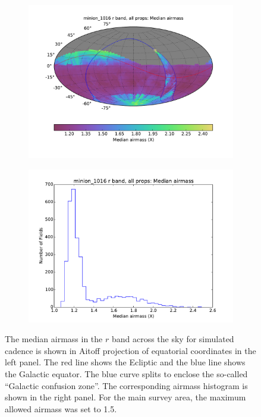 \begin{figure}[tbh!]
\begin{subfigure}[b]{0.49\textwidth}
\includegraphics[angle=0,width=0.99\hsize,clip]{figs/cadence/minion_1016_Median_airmass_r_band_all_props_OPSI_SkyMap.pdf}
\end{subfigure}
\hfill
\begin{subfigure}[b]{0.49\textwidth}
\includegraphics[angle=0,width=0.99\hsize,clip]{figs/cadence/minion_1016_Median_airmass_r_band_all_props_OPSI_Histogram.pdf}
\end{subfigure}
\caption{The median airmass in the $r$ band across the sky for simulated cadence
 is shown in Aitoff projection of equatorial coordinates
in the left panel. The red line shows the Ecliptic and the blue line shows the Galactic
equator. The blue curve splits to enclose the so-called ``Galactic confusion zone''. The corresponding
airmass histogram is shown in the right panel. For the main survey area, the maximum
allowed airmass was set to 1.5. }
\label{fig:airmassenigma}
\end{figure}

